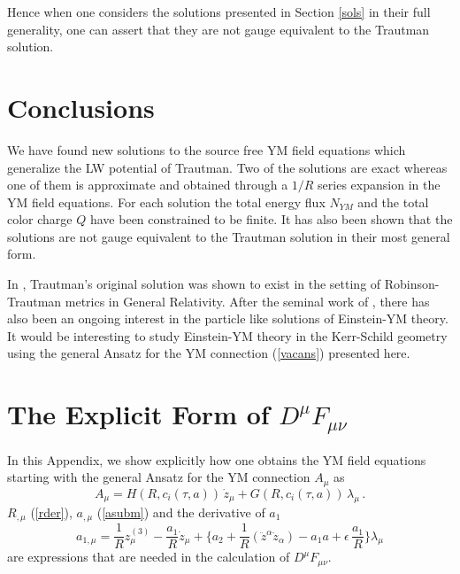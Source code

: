 \documentclass[a4paper,twocolumn,prd,showpacs,amsmath,amssymb]{revtex4}
\begin{document}
Hence when one considers the solutions presented in Section \ref{sols} in
their full generality, one can assert that they are not gauge equivalent
to the Trautman solution.

\section{\label{concs} Conclusions}

We have found new solutions to the source free YM field equations which
generalize the LW potential of Trautman. Two of the solutions are exact
whereas one of them is approximate and obtained through a $1/R$ series
expansion in the YM field equations. For each solution the total energy
flux $N_{YM}$ and the total color charge $Q$ have been constrained to
be finite. It has also been shown that the solutions are not gauge
equivalent to the Trautman solution in their most general form.

In \cite{gurses}, Trautman's original solution was shown to exist in the
setting of Robinson-Trautman metrics in General Relativity. After the
seminal work of \cite{bamck}, there has also been an ongoing interest
in the particle like solutions of Einstein-YM theory. It would be
interesting to study Einstein-YM theory in the Kerr-Schild geometry
using the general Ansatz for the YM connection (\ref{vacans}) presented
here.

\appendix
\section{\label{app1} The Explicit Form of $D^{\mu} F_{\mu\nu}$}

In this Appendix, we show explicitly how one obtains the YM field equations
starting with the general Ansatz for the YM connection $A_{\mu}$ as
\[ A_{\mu} = H(R,c_i (\tau,a)) \, \dot{z}_{\mu}
+ G(R,c_i (\tau,a)) \, \lambda_{\mu} \, .\]
$R_{,\mu}$ (\ref{rder}), $a_{,\mu}$ (\ref{asubm}) and the derivative of
$a_1$
\begin{equation}
a_{1,\mu} = \frac{1}{R} z^{(3)}_{\mu} - \frac{a_1}{R} \dot{z}_{\mu}
+ \{ a_2 + \frac{1}{R} (\ddot{z}^{\alpha} \ddot{z}_{\alpha})
- a_1 a + \epsilon \, \frac{a_1}{R} \} \lambda_{\mu} \label{a1der}
\end{equation}
are expressions that are needed in the calculation of $D^{\mu} F_{\mu\nu}$.
\end{document}
